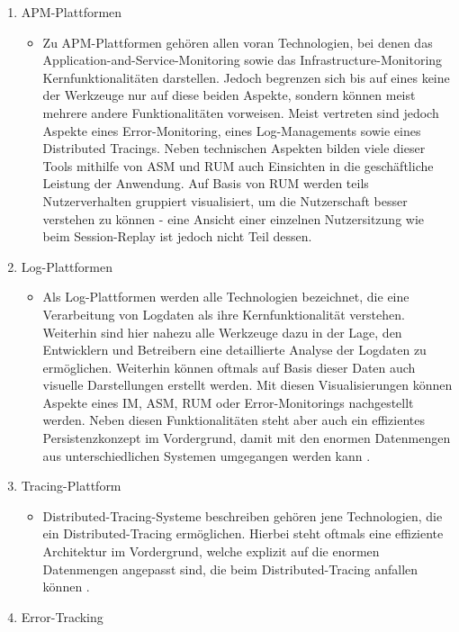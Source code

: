 \begin{enumerate}
	\item APM-Plattformen
	\begin{itemize}
		\item Zu APM-Plattformen gehören allen voran Technologien, bei denen das Application-and-Service-Monitoring sowie das Infrastructure-Monitoring Kernfunktionalitäten darstellen. Jedoch begrenzen sich bis auf eines keine der Werkzeuge nur auf diese beiden Aspekte, sondern können meist mehrere andere Funktionalitäten vorweisen. Meist vertreten sind jedoch Aspekte eines Error-Monitoring, eines Log-Managements sowie eines Distributed Tracings. Neben technischen Aspekten bilden viele dieser Tools mithilfe von ASM und RUM auch Einsichten in die geschäftliche Leistung der Anwendung. Auf Basis von RUM werden teils Nutzerverhalten gruppiert visualisiert, um die Nutzerschaft besser verstehen zu können - eine Ansicht einer einzelnen Nutzersitzung wie beim Session-Replay ist jedoch nicht Teil dessen.
	\end{itemize}
	\item Log-Plattformen
	\begin{itemize}
		\item Als Log-Plattformen werden alle Technologien bezeichnet, die eine Verarbeitung von Logdaten als ihre Kernfunktionalität verstehen. Weiterhin sind hier nahezu alle Werkzeuge dazu in der Lage, den Entwicklern und Betreibern eine detaillierte Analyse der Logdaten zu ermöglichen. Weiterhin können oftmals auf Basis dieser Daten auch visuelle Darstellungen erstellt werden. Mit diesen Visualisierungen können Aspekte eines IM, ASM, RUM oder Error-Monitorings nachgestellt werden. Neben diesen Funktionalitäten steht aber auch ein effizientes Persistenzkonzept im Vordergrund, damit mit den enormen Datenmengen aus unterschiedlichen Systemen umgegangen werden kann \cite{TowardsAutomatedLogParsingForLargeScale}.
	\end{itemize}
	\item Tracing-Plattform
	\begin{itemize}
		\item Distributed-Tracing-Systeme beschreiben gehören jene Technologien, die ein Distributed-Tracing ermöglichen. Hierbei steht oftmals eine effiziente Architektur im Vordergrund, welche explizit auf die enormen Datenmengen angepasst sind, die beim Distributed-Tracing anfallen können \cite{DapperInfrastructure}.
	\end{itemize}
	\item Error-Tracking

\end{enumerate}
